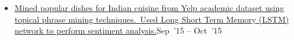 \documentclass[10pt,a4paper]{article}
\begin{document}
\begin{itemize}[labelindent=1.5em,labelsep=-0.3cm,leftmargin=*]
\item \headedsubsection  %
  {\href{}{\normalfont Mined popular dishes for Indian cuisine from Yelp academic dataset using topical phrase mining techniques.~Used Long Short Term Memory (LSTM) network to perform sentiment analysis.}}{{{Sep~'15 -- Oct~'15}}}
  {}


\end{itemize}


\spacedhrule{0.5em}{-0.4em}
\end{document}
